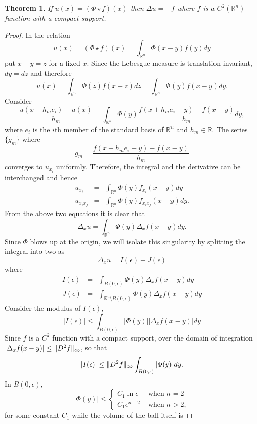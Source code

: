 \documentclass{article}
\DeclarePairedDelimiter\norm{\lVert}{\rVert}
\theoremstyle{plain}
\newtheorem{thm}{Theorem}
\numberwithin{thm}{section}
\theoremstyle{plain}
\numberwithin{prop}{section}
\theoremstyle{definition}
\numberwithin{defn}{section}
\theoremstyle{remark}
\numberwithin{equation}{section}
\begin{document}
\begin{thm}\label{s20t1}
If $u(x) = (\Phi \star f)(x)$ then $\Delta u = - f$ where $f$ is a $C^2(\mathbb{R}^n)$ function with a 
compact support.
\end{thm}
\begin{proof}
In the relation 
\[
u(x) = (\Phi \star f)(x) = \int_{\mathbb{R}^n}\Phi(x - y)f(y)dy
\]
put $x - y = z$ for a fixed $x$. Since the Lebesgue measure is translation invariant, $dy = dz$ 
and therefore
\[
u(x) = \int_{\mathbb{R}^n}\Phi(z)f(x - z)dz = \int_{\mathbb{R}^n}\Phi(y)f(x - y)dy.
\]
Consider
\[
\frac{u(x + h_m e_i) - u(x)}{h_m} = \int_{\mathbb{R}^n}\Phi(y)\frac{f(x+h_me_i-y) - f(x-y)}{h_m}dy,
\]
where $e_i$ is the $i$th member of the standard basis of $\mathbb{R}^n$ and $h_m \in \mathbb{R}$. The
series $\{g_m\}$ where
\[
g_m = \frac{f(x+h_me_i-y) - f(x-y)}{h_m}
\]
converges to $u_{x_i}$ uniformly. Therefore, the integral and the derivative can be interchanged
and hence
\begin{eqnarray}
u_{x_i} &=& \int_{\mathbb{R}^n}\Phi(y)f_{x_i}(x - y)dy \\
u_{x_ix_j} &=& \int_{\mathbb{R}^n}\Phi(y)f_{x_ix_j}(x - y)dy.
\end{eqnarray}
From the above two equations it is clear that
\[
\Delta_x u = \int_{\mathbb{R}^n}\Phi(y)\Delta_xf(x - y)dy.
\]
Since $\Phi$ blows up at the origin, we will isolate this singularity by splitting the integral
into two as
\begin{equation}\label{s20e4}
\Delta_x u = I(\epsilon) + J(\epsilon)
\end{equation}
where
\begin{eqnarray}
I(\epsilon) &=& \int_{B(0, \epsilon)}\Phi(y)\Delta_xf(x - y)dy \label{s20e5} \\
J(\epsilon) &=& \int_{\mathbb{R}^n \setminus B(0, \epsilon)}\Phi(y)\Delta_xf(x - y)dy \label{s20e6} 
\end{eqnarray}
Consider the modulus of $I(\epsilon)$,
\[
|I(\epsilon)| \le \int_{B(0, \epsilon)}|\Phi(y)||\Delta_x f(x - y)|dy 
\]
Since $f$ is a $C^2$ function with a compact support, over the domain of integration $|\Delta_x
f(x-y)| \le \norm{D^2f}_\infty$, so that
\[
|I(\epsilon)| \le \norm{D^2f}_\infty \int_{B(0, \epsilon)}|\Phi(y)|dy.
\]
In $B(0, \epsilon)$, 
\[
|\Phi(y)| \le \begin{cases}
C_1\ln\epsilon & \text{ when } n = 2 \\
C_1\epsilon^{n-2} & \text{ when } n > 2,
\end{cases}
\]
for some constant $C_1$ while the volume of the ball itself is 

\end{proof}
\end{document}
